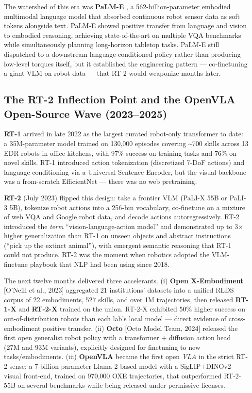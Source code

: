 \documentclass{article}
\begin{document}
The watershed of this era was \textbf{PaLM-E} \cite{driess2023palmeanembodiedmul}, a 562-billion-parameter embodied multimodal language model that absorbed continuous robot sensor data as soft tokens alongside text. PaLM-E showed positive transfer from language and vision to embodied reasoning, achieving state-of-the-art on multiple VQA benchmarks while simultaneously planning long-horizon tabletop tasks. PaLM-E still dispatched to a downstream language-conditioned policy rather than producing low-level torques itself, but it established the engineering pattern --- co-finetuning a giant VLM on robot data --- that RT-2 would weaponize months later.

\subsection{The RT-2 Inflection Point and the OpenVLA Open-Source Wave (2023--2025)}\label{the-rt-2-inflection-point-and-the-openvla-open-source-wave-20232025}

\textbf{RT-1} \cite{brohan2023rt2visionlanguagea} arrived in late 2022 as the largest curated robot-only transformer to date: a 35M-parameter model trained on 130,000 episodes covering \textasciitilde700 skills across 13 EDR robots in office kitchens, with 97\% success on training tasks and 76\% on novel skills. RT-1 introduced action tokenization (discretized 7-DoF actions) and language conditioning via a Universal Sentence Encoder, but the visual backbone was a from-scratch EfficientNet --- there was no web pretraining.

\textbf{RT-2} \cite{brohan2023rt2visionlanguagea} (July 2023) flipped this design: take a frontier VLM (PaLI-X 55B or PaLI-3 5B), tokenize robot actions into a 256-bin vocabulary, co-finetune on a mixture of web VQA and Google robot data, and decode actions autoregressively. RT-2 introduced the \emph{term} ``vision-language-action model'' and demonstrated up to 3× higher generalization than RT-1 on unseen objects and abstract instructions (``pick up the extinct animal''), with emergent semantic reasoning that RT-1 could not produce. RT-2 was the moment when robotics adopted the VLM-finetune playbook that NLP had been using since 2018.

The next twelve months delivered three accelerants. (i) \textbf{Open X-Embodiment} {[}O'Neill et al., 2023{]} aggregated 21 institutions' datasets into a unified RLDS corpus of 22 embodiments, 527 skills, and over 1M trajectories, then released \textbf{RT-1-X} and \textbf{RT-2-X} trained on the union. RT-2-X exhibited 50\% higher success on out-of-distribution robots than each lab's local model --- direct evidence of cross-embodiment positive transfer. (ii) \textbf{Octo} {[}Octo Model Team, 2024{]} released the first open generalist robot policy with a transformer + diffusion action head (27M and 93M variants), explicitly designed for finetuning to new tasks/embodiments. (iii) \textbf{OpenVLA} \cite{kim2024openvlaanopensourc} became the first open \emph{VLA} in the strict RT-2 sense: a 7-billion-parameter Llama-2-based model with a SigLIP+DINOv2 visual front-end, trained on 970,000 OXE trajectories, that outperformed RT-2-55B on several benchmarks while being released under permissive licenses.
\end{document}
